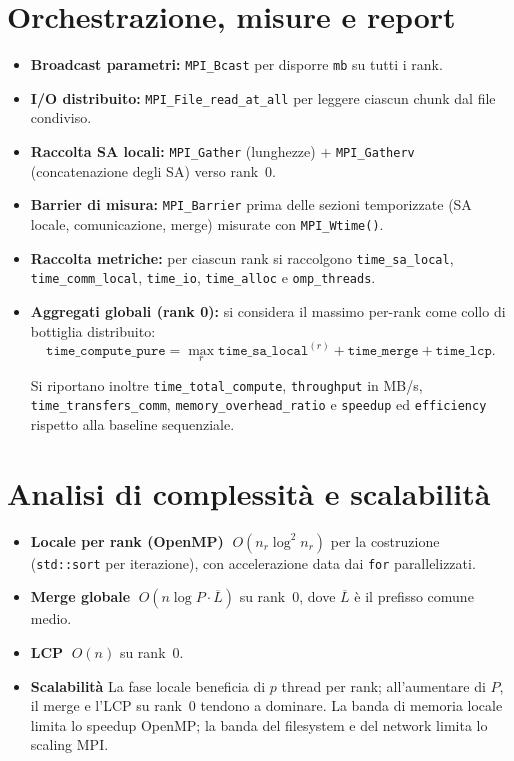 	\section{Orchestrazione, misure e report}
		\begin{itemize}
			\item \textbf{Broadcast parametri:} \texttt{MPI\_Bcast} per disporre \texttt{mb} su tutti i rank.
			\item \textbf{I/O distribuito:} \texttt{MPI\_File\_read\_at\_all} per leggere ciascun chunk dal file condiviso.
			\item \textbf{Raccolta SA locali:} \texttt{MPI\_Gather} (lunghezze) + \texttt{MPI\_Gatherv} (concatenazione degli SA) verso rank~0.
			\item \textbf{Barrier di misura:} \texttt{MPI\_Barrier} prima delle sezioni temporizzate (SA locale, comunicazione, merge) misurate con \texttt{MPI\_Wtime()}.
			\item \textbf{Raccolta metriche:} per ciascun rank si raccolgono \texttt{time\_sa\_local}, \texttt{time\_comm\_local}, \texttt{time\_io}, \texttt{time\_alloc} e \texttt{omp\_threads}.
			\item \textbf{Aggregati globali (rank 0):} si considera il massimo per-rank come collo di bottiglia distribuito:
			\[
				\texttt{time\_compute\_pure} = \max_r \texttt{time\_sa\_local}^{(r)} + \texttt{time\_merge} + \texttt{time\_lcp}.
			\]
			
			Si riportano inoltre \texttt{time\_total\_compute}, \texttt{throughput} in MB/s, \texttt{time\_transfers\_comm}, \texttt{memory\_overhead\_ratio} e \texttt{speedup} ed \texttt{efficiency} rispetto alla baseline sequenziale.
		\end{itemize}
	
	\section{Analisi di complessità e scalabilità}
		\begin{itemize}
			\item \textbf{Locale per rank (OpenMP)} \(\;O(n_r \log^2 n_r)\) per la costruzione (\texttt{std::sort} per iterazione), con accelerazione data dai \texttt{for} parallelizzati.
			\item \textbf{Merge globale} \(\;O(n \log P \cdot \overline{L})\) su rank~0, dove \(\overline{L}\) è il prefisso comune medio.
			\item \textbf{LCP} \(\;O(n)\) su rank~0.
			\item \textbf{Scalabilità} La fase locale beneficia di \(p\) thread per rank; all’aumentare di \(P\), il merge e l’LCP su rank~0 tendono a dominare. La banda di memoria locale limita lo speedup OpenMP; la banda del filesystem e del network limita lo scaling MPI\@.
		\end{itemize}
	
